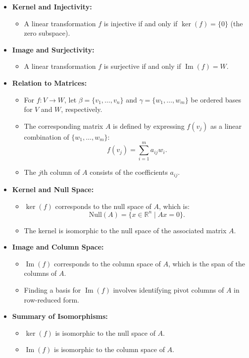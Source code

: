 \documentclass{article}
\begin{document}
\begin{itemize}
  \item \textbf{Kernel and Injectivity:}
    \begin{itemize}
      \item A linear transformation $f$ is injective if and only if $\ker(f) = \{0\}$ (the zero subspace).
    \end{itemize}

  \item \textbf{Image and Surjectivity:}
    \begin{itemize}
      \item A linear transformation $f$ is surjective if and only if $\operatorname{Im}(f) = W$.
    \end{itemize}

  \item \textbf{Relation to Matrices:}
    \begin{itemize}
      \item For $f: V \to W$, let $\beta = \{v_1, \dots, v_n\}$ and $\gamma = \{w_1, \dots, w_m\}$ be ordered bases for $V$ and $W$, respectively.
      \item The corresponding matrix $A$ is defined by expressing $f(v_j)$ as a linear combination of $\{w_1, \dots, w_m\}$:
        \[
          f(v_j) = \sum_{i=1}^m a_{ij} w_i.
        \]
      \item The $j$th column of $A$ consists of the coefficients $a_{ij}$.
    \end{itemize}

  \item \textbf{Kernel and Null Space:}
    \begin{itemize}
      \item $\ker(f)$ corresponds to the null space of $A$, which is:
        \[
          \text{Null}(A) = \{x \in \mathbb{R}^n \mid Ax = 0\}.
        \]
      \item The kernel is isomorphic to the null space of the associated matrix $A$.
    \end{itemize}

  \item \textbf{Image and Column Space:}
    \begin{itemize}
      \item $\operatorname{Im}(f)$ corresponds to the column space of $A$, which is the span of the columns of $A$.
      \item Finding a basis for $\operatorname{Im}(f)$ involves identifying pivot columns of $A$ in row-reduced form.
    \end{itemize}

  \item \textbf{Summary of Isomorphisms:}
    \begin{itemize}
      \item $\ker(f)$ is isomorphic to the null space of $A$.
      \item $\operatorname{Im}(f)$ is isomorphic to the column space of $A$.
    \end{itemize}
\end{itemize}
\end{document}
